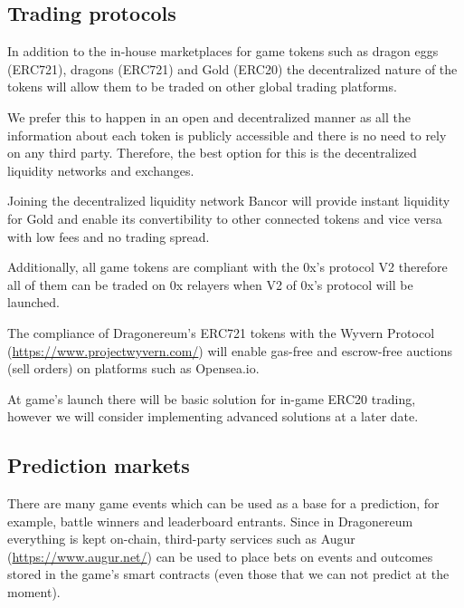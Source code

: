 \documentclass[12pt]{article}
\begin{document}
\vspace{\baselineskip}
\subsection{Trading protocols}\label{Trading protocols}\par

In addition to the in-house marketplaces for game tokens such as dragon eggs (ERC721), dragons (ERC721) and Gold (ERC20) the decentralized nature of the tokens will allow them to be traded on other global trading platforms.\par

We prefer this to happen in an open and decentralized manner as all the information about each token is publicly accessible and there is no need to rely on any third party. Therefore, the best option for this is the decentralized liquidity networks and exchanges.\par

Joining the decentralized liquidity network Bancor will provide instant liquidity for Gold and enable its convertibility to other connected tokens and vice versa with low fees and no trading spread.\par

Additionally, all game tokens are compliant with the 0x’s protocol V2 therefore all of them can be traded on 0x relayers when V2 of 0x’s protocol will be launched.\par

The compliance of Dragonereum’s ERC721 tokens with the Wyvern Protocol (\url{https://www.projectwyvern.com/}) will enable gas-free and escrow-free auctions (sell orders) on platforms such as Opensea.io.\par

At game's launch there will be basic solution for in-game ERC20 trading, however we will consider implementing advanced solutions at a later date.\par


\vspace{\baselineskip}
\subsection{Prediction markets}\label{Prediction markets}\par

There are many game events which can be used as a base for a prediction, for example, battle winners and leaderboard entrants. Since in Dragonereum everything is kept on-chain, third-party services such as Augur (\url{https://www.augur.net/}) can be used to place bets on events and outcomes stored in the game’s smart contracts (even those that we can not predict at the moment).\par
\end{document}
